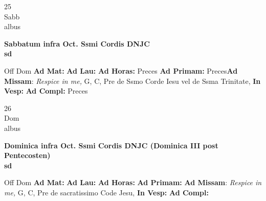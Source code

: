\documentclass[10pt, openany]{book}
\begin{document}
    \begin{center}
        \begin{minipage}{3.5in}
            \vspace{2em}
            \begin{minipage}{0.5in}
                {\Huge 25} \\
                {\normalsize Sabb} \\
                {\normalsize albus}
            \end{minipage}
            \begin{minipage}{3.0in}
                \textbf{ \large Sabbatum infra Oct. Ssmi Cordis DNJC \\
                \textnormal{\normalsize sd}} \\ 
            \end{minipage}
            \begin{justify}Off Dom
                \textbf{Ad Mat: }
                \textbf{Ad Lau: }
                \textbf{Ad Horas: }Preces
                \textbf{Ad Primam: }Preces\textbf{Ad Missam}: \textit{Respice in me,} G, C, Pre de Ssmo Corde Iesu vel de Ssma Trinitate,  
                \textbf{In Vesp: }
                \textbf{Ad Compl: }Preces
            \end{justify}
        \end{minipage}
    \end{center}

    \begin{center}
        \begin{minipage}{3.5in}
            \vspace{2em}
            \begin{minipage}{0.5in}
                {\Huge 26} \\
                {\normalsize Dom} \\
                {\normalsize albus}
            \end{minipage}
            \begin{minipage}{3.0in}
                \textbf{ \large Dominica infra Oct. Ssmi Cordis DNJC (Dominica III post Pentecosten) \\
                \textnormal{\normalsize sd}} \\ 
            \end{minipage}
            \begin{justify}Off Dom
                \textbf{Ad Mat: }
                \textbf{Ad Lau: }
                \textbf{Ad Horas: }
                \textbf{Ad Primam: }\textbf{Ad Missam}: \textit{Respice in me,} G, C, Pre de sacratissimo Code Jesu,  
                \textbf{In Vesp: }
                \textbf{Ad Compl: }
            \end{justify}
        \end{minipage}
    \end{center}
\end{document}
